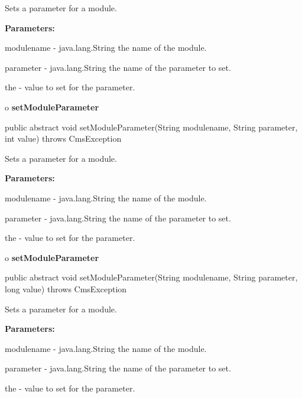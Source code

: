 \begin{description}
\htmlDD Sets a parameter for a module. 

\begin{description}
\item {\bf Parameters:}  

modulename - java.lang.String the name of the module.  

parameter - java.lang.String the name of the parameter to set.  

the - value to set for the parameter.  
\end{description}

\end{description}

o {\bf setModuleParameter} 

\begin{PRE}
 public abstract void setModuleParameter(String modulename,
                                         String parameter,
                                         int value) throws CmsException
\end{PRE}

\begin{description}
\htmlDD Sets a parameter for a module. 

\begin{description}
\item {\bf Parameters:}  

modulename - java.lang.String the name of the module.  

parameter - java.lang.String the name of the parameter to set.  

the - value to set for the parameter.  
\end{description}

\end{description}

o {\bf setModuleParameter} 

\begin{PRE}
 public abstract void setModuleParameter(String modulename,
                                         String parameter,
                                         long value) throws CmsException
\end{PRE}

\begin{description}
\htmlDD Sets a parameter for a module. 

\begin{description}
\item {\bf Parameters:}  

modulename - java.lang.String the name of the module.  

parameter - java.lang.String the name of the parameter to set.  

the - value to set for the parameter.  
\end{description}

\end{description}

